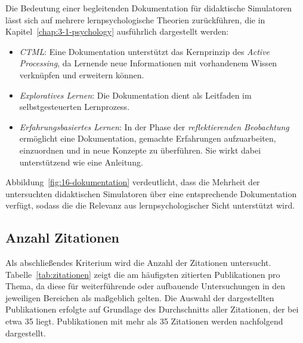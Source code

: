 Die Bedeutung einer begleitenden Dokumentation für didaktische Simulatoren lässt sich auf mehrere lernpsychologische Theorien zurückführen, die in Kapitel~\ref{chap:3-1-psychology} ausführlich dargestellt werden:

\begin{itemize}
    \item \textit{\ac{CTML}}: Eine Dokumentation unterstützt das Kernprinzip des \textit{Active Processing}, da Lernende neue Informationen mit vorhandenem Wissen verknüpfen und erweitern können.
    \item \textit{Exploratives Lernen}: Die Dokumentation dient als Leitfaden im selbstgesteuerten Lernprozess.
    \item \textit{Erfahrungsbasiertes Lernen}: In der Phase der \textit{reflektierenden Beobachtung} ermöglicht eine Dokumentation, gemachte Erfahrungen aufzuarbeiten, einzuordnen und in neue Konzepte zu überführen. Sie wirkt dabei unterstützend wie eine Anleitung.
\end{itemize}

Abbildung~\ref{fig:16-dokumentation} verdeutlicht, dass die Mehrheit der untersuchten didaktischen Simulatoren über eine entsprechende Dokumentation verfügt, sodass die die Relevanz aus lernpsychologischer Sicht unterstützt wird.

\subsection{Anzahl Zitationen}

Als abschließendes Kriterium wird die Anzahl der Zitationen untersucht. Tabelle~\ref{tab:zitationen} zeigt die am häufigsten zitierten Publikationen pro Thema, da diese für weiterführende oder aufbauende Untersuchungen in den jeweiligen Bereichen als maßgeblich gelten. Die Auswahl der dargestellten Publikationen erfolgte auf Grundlage des Durchschnitts aller Zitationen, der bei etwa 35 liegt. Publikationen mit mehr als 35 Zitationen werden nachfolgend dargestellt.

